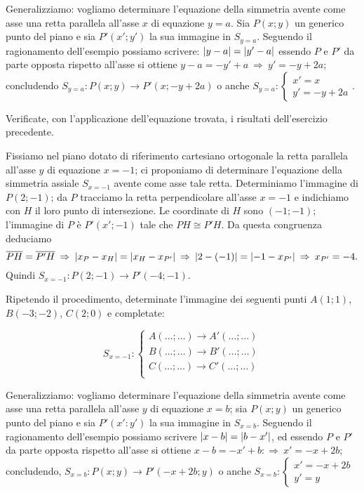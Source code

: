 Generalizziamo: vogliamo determinare l'equazione della simmetria avente come asse una retta parallela all'asse $x$ di equazione $y=a$. Sia $P(x;y)$ un generico punto del piano e sia $P'(x';y')$ la sua immagine in $S_{y=a}$. Seguendo il ragionamento dell'esempio possiamo scrivere: $\left|y-a\right| = \left|y'-a\right|$ essendo $P$ e $P'$ da parte opposta rispetto all'asse si ottiene $y-a=-y'+a\:\Rightarrow\: y'=-y+2a$; concludendo $S_{y=a}:P(x;y)\rightarrow P'(x;-y+2a)$ o anche $S_{y=a}:\begin{cases}x'=x\\ y'=-y+2a \end{cases}$.

Verificate, con l'applicazione dell'equazione trovata, i risultati dell'esercizio precedente.

\begin{exrig}
\begin{esempio}
Fissiamo nel piano dotato di riferimento cartesiano ortogonale la retta parallela all'asse $y$ di equazione $x=-1$; ci proponiamo di determinare l'equazione della simmetria assiale $S_{x=-1}$ avente come asse tale retta. Determiniamo l'immagine di $P(2;-1)$; da $P$ tracciamo la retta perpendicolare all'asse $x=-1$ e indichiamo con $H$ il loro punto di intersezione. Le coordinate di $H$ sono $(-1;-1)$; l'immagine di $P$ è $P'(x';-1)$ tale che $PH\cong P'H$. Da questa congruenza deduciamo
\[\overline{PH}=\overline{P'H}\:\Rightarrow\:\left|x_P-x_H\right|=\left|x_H-x_{P'}\right|\:\Rightarrow\:\left|2-(-1)\right|=\left|-1-x_{P'}\right|\:\Rightarrow\:x_{P'}=-4.\]
Quindi $S_{x=-1}:P(2;-1)\rightarrow P'(-4;-1)$.

Ripetendo il procedimento, determinate l'immagine dei seguenti punti $A(1;1)$, $B(-3;-2)$, $C(2;0)$ e completate:

\[S_{x=-1}:\begin{cases}A(\ldots{};\ldots{}) \rightarrow A'(\ldots{};\ldots{})\\
B(\ldots{};\ldots{}) \rightarrow B'(\ldots{};\ldots{})\\
C(\ldots{};\ldots{}) \rightarrow C'(\ldots{};\ldots{})\\ \end{cases}\]
\end{esempio}
\end{exrig}

Generalizziamo: vogliamo determinare l'equazione della simmetria avente come asse una retta parallela all'asse $y$ di equazione $x=b$; sia $P(x;y)$ un generico punto del piano e sia $P'(x':y')$ la sua immagine in $S_{x=b}$. Seguendo il ragionamento dell'esempio possiamo scrivere $\left|x-b\right|=\left|b-x'\right|$, ed essendo $P$ e $P'$ da parte opposta rispetto all'asse si ottiene $x-b=-x'+b:\Rightarrow\: x'=-x+2b$; concludendo, $S_{x=b}:P(x;y)\rightarrow P'(-x+2b;y)$ o anche $S_{x=b}:\begin{cases}x'=-x+2b\\y'=y \end{cases}$


